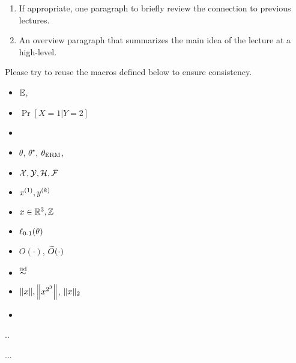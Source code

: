 

\begin{enumerate}
	\item If appropriate, one paragraph to briefly review the connection to previous lectures.
	\item An overview paragraph that summarizes the main idea of the lecture at a high-level. 
\end{enumerate}  
Please try to reuse the macros defined below to ensure consistency.
\begin{itemize}
	\item $\Exp$, 
	\item $\Pr[X=1\vert Y=2]$
	\item 
	\item 
	$\theta$, $\theta^\star$, $\thetaerm$, 
	\item 
	$\cX,\cY, \cH, \cF$
	\item $x\sp{1}, y\sp{k}$
	\item 
	$x\in \R^3, \bbZ$
	\item $\err(\theta)$
	\item $O(\cdot)$, $\tilO(\cdot)$
	\item $\iid$
	\item $\norm{x}, \Norm{x^{2^3}}$, $\norm{x}_{2}$
	\item 
\end{itemize}
\begin{theorem}
	..
\end{theorem}
\begin{lemma}
	...
\end{lemma}

